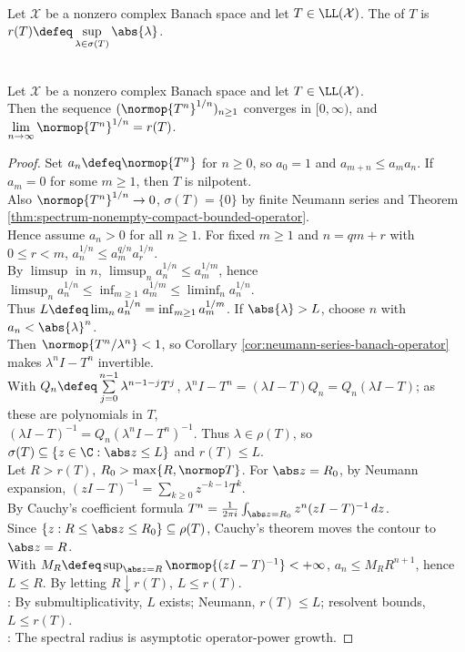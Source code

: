 \begin{definition} \label{def:spectral-radius-bounded-operator} \\
Let $\mathcal{X}$ be a nonzero complex Banach space and let $T\in\LL(\mathcal{X})$. The  of $T$ is $r(T)\defeq\sup\limits_{\lambda\in\sigma(T)}\abs{\lambda}$.
\end{definition}

\begin{theorem} \label{thm:spectral-radius-formula} \\
Let $\mathcal{X}$ be a nonzero complex Banach space and let $T\in\LL(\mathcal{X})$.\\
Then the sequence $(\normop{T^n}^{1/n})_{n\geq1}$ converges in $[0,\infty)$, and $\lim\limits_{n\to\infty}\normop{T^n}^{1/n}=r(T)$.
\begin{proof}
Set $a_n\defeq\normop{T^n}$ for $n\geq0$, so $a_0=1$ and $a_{m+n}\leq a_ma_n$. If $a_m=0$ for some $m\geq1$, then $T$ is nilpotent.\\
Also $\normop{T^n}^{1/n}\to0$, $\sigma(T)=\{0\}$ by finite Neumann series and Theorem \ref{thm:spectrum-nonempty-compact-bounded-operator}.\\
Hence assume $a_n>0$ for all $n\geq1$. For fixed $m\geq1$ and $n=qm+r$ with $0\leq r<m$, $a_n^{1/n}\leq a_m^{q/n}a_r^{1/n}$.\\
By $\limsup$ in $n$, $\limsup_n a_n^{1/n}\leq a_m^{1/m}$, hence $\limsup_n a_n^{1/n}\leq\inf_{m\geq1}a_m^{1/m}\leq\liminf_n a_n^{1/n}$.\\
Thus $L\defeq\lim_n a_n^{1/n}=\inf_{m\geq1}a_m^{1/m}$. If $\abs{\lambda}>L$, choose $n$ with $a_n<\abs{\lambda}^n$.\\
Then $\normop{T^n/\lambda^n}<1$, so Corollary \ref{cor:neumann-series-banach-operator} makes $\lambda^nI-T^n$ invertible.\\
With $Q_n\defeq\sum\limits_{j=0}^{n-1}\lambda^{n-1-j}T^j$, $\lambda^nI-T^n=(\lambda I-T)Q_n=Q_n(\lambda I-T)$; as these are polynomials in $T$,\\
$(\lambda I-T)^{-1}=Q_n(\lambda^nI-T^n)^{-1}$. Thus $\lambda\in\rho(T)$, so $\sigma(T)\subseteq\{z\in\C:\abs z\leq L\}$ and $r(T)\leq L$.\\
Let $R>r(T)$, $R_0>\max\{R,\normop T\}$. For $\abs z=R_0$, by Neumann expansion, $(zI-T)^{-1}=\sum\limits_{k\geq0}z^{-k-1}T^k$.\\
By Cauchy's coefficient formula $T^n=\frac{1}{2\pi i}\int_{\abs z=R_0}z^n(zI-T)^{-1}\,dz$.\\
Since $\{z:R\leq\abs z\leq R_0\}\subseteq\rho(T)$, Cauchy's theorem moves the contour to $\abs z=R$.\\
With $M_R\defeq\sup_{\abs z=R}\normop{(zI-T)^{-1}}<+\infty$, $a_n\leq M_RR^{n+1}$, hence $L\leq R$. By letting $R\downarrow r(T)$, $L\leq r(T)$.\\
: By submultiplicativity, $L$ exists; Neumann, $r(T)\leq L$; resolvent bounds, $L\leq r(T)$.\\
: The spectral radius is asymptotic operator-power growth.
\end{proof}
\end{theorem}


